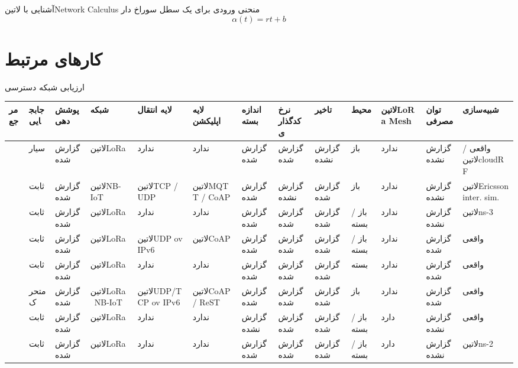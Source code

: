 \documentclass[dvipsnames]{beamer}
\begin{document}
\begin{persian}
	\begin{frame}{آشنایی با ‌لاتین{Network Calculus}}
			 منحنی ورودی برای یک سطل سوراخ دار
			\[ \alpha(t) = rt + b \]
	\end{frame}

	\section{کارهای مرتبط}

	\begin{frame}{ارزیابی شبکه دسترسی}
		\fontsize{5pt}{6pt}\selectfont
		\begin{tabularx}{\textwidth}{|*{13}{X|}}
			\toprule
			مرجع &
			جابجایی &
			پوشش‌دهی &
			شبکه &
			لایه انتقال &
			لایه اپلیکشن &
			اندازه بسته &
			نرخ کدگذاری &
			تاخیر &
			محیط &
			‌لاتین{LoRa Mesh} &
			توان مصرفی &
			شبیه‌سازی \\
			\midrule
			\cite{sensors-18-00772-v3} &
			سیار &
			گزارش شده &
			‌لاتین{LoRa} &
			ندارد &
			ندارد &
			گزارش شده &
			گزارش شده &
			گزارش نشده &
			باز &
			ندارد &
			گزارش نشده &
			واقعی / ‌لاتین{cloudRF} \\
			\midrule
			\cite{sensors-19-00007} &
			ثابت &
			گزارش شده &
			‌لاتین{NB-IoT} &
			‌لاتین{TCP / UDP} &
			‌لاتین{MQTT / CoAP} &
			گزارش شده &
			گزارش نشده &
			گزارش شده &
			باز &
			ندارد &
			گزارش نشده &
			‌لاتین{Ericsson inter. sim.} \\
			\midrule
			\cite{sensors-20-03061-v2} &
			ثابت &
			گزارش شده &
			‌لاتین{LoRa} &
			ندارد &
			ندارد &
			گزارش شده &
			گزارش شده &
			گزارش شده &
			باز / بسته &
			ندارد &
			گزارش نشده &
			‌لاتین{ns-3} \\
			\midrule
			\cite{sensors-20-00280-v2} &
			ثابت &
			گزارش شده &
			‌لاتین{LoRa} &
			‌لاتین{UDP ov IPv6} &
			‌لاتین{CoAP} &
			گزارش شده &
			گزارش شده &
			گزارش شده &
			باز / بسته &
			ندارد &
			گزارش شده &
			واقعی \\
			\midrule
			\cite{sensors-20-06721} &
			ثابت &
			گزارش شده &
			‌لاتین{LoRa} &
			ندارد &
			ندارد &
			گزارش شده &
			گزارش شده &
			گزارش شده &
			بسته &
			ندارد &
			گزارش شده &
			واقعی \\
			\midrule
			\cite{SanchezIborra2020} &
			متحرک &
			گزارش شده &
			‌لاتین{LoRa \ NB-IoT} &
			‌لاتین{UDP/TCP ov IPv6} &
			‌لاتین{CoAP / ReST} &
			گزارش شده &
			گزارش شده &
			گزارش شده &
			باز &
			ندارد &
			گزارش شده &
			واقعی \\
			\midrule
			\cite{Lee2018} &
			ثابت &
			گزارش شده &
			‌لاتین{LoRa} &
			ندارد &
			ندارد &
			گزارش نشده &
			گزارش شده &
			گزارش شده &
			باز / بسته &
			دارد &
			گزارش نشده &
			واقعی \\
			\midrule
			\cite{Marahatta2021} &
			ثابت &
			گزارش شده &
			‌لاتین{LoRa} &
			ندارد &
			ندارد &
			گزارش شده &
			گزارش شده &
			گزارش شده &
			باز / بسته &
			دارد &
			گزارش نشده &
			‌لاتین{ns-2} \\
			\bottomrule
		\end{tabularx}
	\end{frame}


\end{persian}
\end{document}

